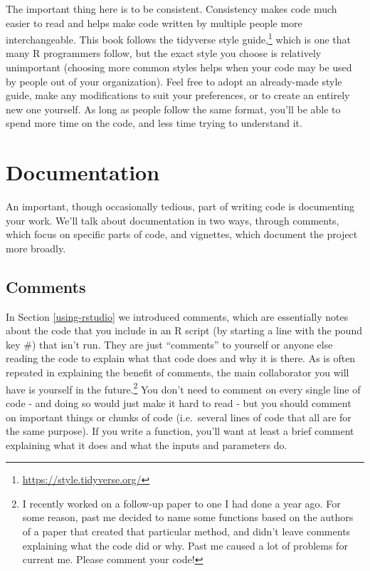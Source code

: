 \documentclass[
]{krantz}
\renewcommand{\href}[2]{#2\footnote{\url{#1}}}
\begin{document}
The important thing here is to be consistent. Consistency
makes code much easier to read and helps make code written
by multiple people more interchangeable. This book follows
the \href{https://style.tidyverse.org/}{tidyverse style
guide,} which is one that many R programmers follow, but the
exact style you choose is relatively unimportant (choosing
more common styles helps when your code may be used by
people out of your organization). Feel free to adopt an
already-made style guide, make any modifications to suit
your preferences, or to create an entirely new one yourself.
As long as people follow the same format, you'll be able to
spend more time on the code, and less time trying to
understand it.

\hypertarget{documentation}{%
\section{Documentation}\label{documentation}}

An important, though occasionally tedious, part of writing
code is documenting your work. We'll talk about
documentation in two ways, through comments, which focus on
specific parts of code, and vignettes, which document the
project more broadly.

\hypertarget{comments}{%
\subsection{Comments}\label{comments}}

In Section \ref{using-rstudio} we introduced comments, which
are essentially notes about the code that you include in an
R script (by starting a line with the pound key \#) that
isn't run. They are just ``comments'' to yourself or anyone
else reading the code to explain what that code does and why
it is there. As is often repeated in explaining the benefit
of comments, the main collaborator you will have is yourself
in the future.\footnote{I recently worked on a follow-up
  paper to one I had done a year ago. For some reason, past
  me decided to name some functions based on the authors of
  a paper that created that particular method, and didn't
  leave comments explaining what the code did or why. Past
  me caused a lot of problems for current me. Please comment
  your code!} You don't need to comment on every single line
of code - and doing so would just make it hard to read - but
you should comment on important things or chunks of code
(i.e.~several lines of code that all are for the same
purpose). If you write a function, you'll want at least a
brief comment explaining what it does and what the inputs
and parameters do.
\end{document}
